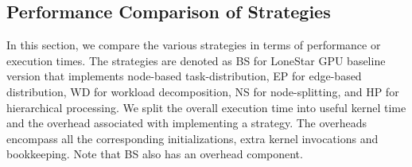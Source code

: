 \begin {figure*}
\centering
{}
\caption{Comparison of Load Balancing Strategies for \textbf{BFS}}
\label{overall-comparisons-bfs}
\label{very_large_graph_results}
\end{figure*}


\subsection{Performance Comparison of Strategies}\label{expt:exectime}

In this section, we compare the various strategies in terms of performance or execution times. The strategies are denoted as BS for LoneStar GPU baseline version that implements node-based task-distribution, EP for edge-based distribution, WD for workload decomposition, NS for node-splitting, and HP for hierarchical processing. We split the overall execution time into useful kernel time and the overhead associated with implementing a strategy. The overheads encompass all the corresponding initializations, extra kernel invocations and bookkeeping. Note that BS also has an overhead component.

